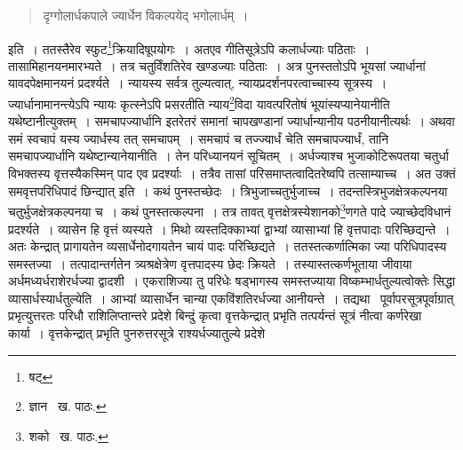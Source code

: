\documentclass[11pt, openany]{book}
\begin{document}
\begin{quote}
{\qt दृग्गोलार्धकपाले ज्यार्धेन विकल्पयेद् भगोलार्धम्~।}
\end{quote}

\noindent इति~। ततस्तैरेव स्फुट\renewcommand{\thefootnote}{१}\footnote{षट्}क्रियादिषूपयोगः~। अतएव गीतिसूत्रेऽपि कलार्धज्याः पठिताः~। तासामिहानयनमारभ्यते~। तत्र चतुर्विंशतिरेव खण्डज्याः पठिताः~। अत्र पुनस्ततोऽपि भूयसां ज्यार्धानां यावदपेक्षमानयनं प्रदर्श्यते~। न्यायस्य सर्वत्र तुल्यत्वात्, न्यायप्रदर्शनपरत्वाच्चास्य सूत्रस्य~। ज्यार्धानामानन्त्येऽपि न्यायः कृत्स्नेऽपि प्रसरतीति न्याय\renewcommand{\thefootnote}{२}\footnote{ज्ञान \textendash\ ख. पाठः.}विदा यावत्परितोषं भूयांस्यप्यानेयानीति यथेष्टानीत्युक्तम्~। समचापज्यार्धानि इतरेतरं समानां चापखण्डानां ज्यार्धान्यानीय पठनीयानीत्यर्थः~। अथवा समं स्वचापं यस्य ज्यार्धस्य तत् समचापम्~। समचापं च तज्ज्यार्धं चेति समचापज्यार्धं, तानि समचापज्यार्धानि यथेष्टान्यानेयानीति~। तेन परिध्यानयनं सूचितम्~। अर्धज्याश्च भुजाकोटिरूपतया चतुर्धा विभक्तस्य वृत्तस्यैकस्मिन् पाद एव प्रदर्श्याः~। तत्रैव तासां परिसमाप्तत्वादितरेष्वपि तत्साम्याच्च~। अत उक्तं {\qt समवृत्तपरिधिपादं छिन्द्यात्} इति~। कथं पुनस्तच्छेदः~। त्रिभुजाच्चतुर्भुजाच्च~। तदन्तस्त्रिभुजक्षेत्रकल्पनया चतुर्भुजक्षेत्रकल्पनया च~।
कथं पुनस्तत्कल्पना~। तत्र तावत् वृत्तक्षेत्रस्येशानको\renewcommand{\thefootnote}{३}\footnote{शको \textendash\ ख. पाठः.}णगते पादे ज्याच्छेदविधानं प्रदर्श्यते~। व्यासेन हि वृत्तं व्यस्यते~। मिथो व्यस्तदिक्काभ्यां द्वाभ्यां व्यासाभ्यां हि वृत्तपादाः परिच्छिद्यन्ते~। अतः केन्द्रात् प्रागायतेन व्यसार्धेनोदगायतेन चायं पादः परिच्छिद्यते~। ततस्तत्कर्णात्मिका ज्या परिधिपादस्य समस्तज्या~। तत्पादान्तर्गतेन त्र्यश्रक्षेत्रेण वृत्तपादस्य छेदः क्रियते~। तस्यास्तत्कर्णभूताया जीवाया अर्धमध्यर्धराशेरर्धज्या द्वादशी~। एकराशिज्या तु परिधेः षड्भागस्य समस्तज्याया विष्कम्भार्धतुल्यत्वोक्तेः सिद्धा व्यासार्धस्यार्धतुल्येति~। आभ्यां व्यासार्धेन चान्या एकविंशतिरर्धज्या आनीयन्ते~। तद्यथा \textendash\ पूर्वापरसूत्रपूर्वाग्रात् प्रभृत्युत्तरतः परिधौ राशिलिप्तान्तरे प्रदेशे बिन्दुं कृत्वा वृत्तकेन्द्रात् प्रभृति तत्पर्यन्तं सूत्रं नीत्वा कर्णरेखा कार्या~। वृत्तकेन्द्रात् प्रभृति पुनरुत्तरसूत्रे राश्यर्धज्यातुल्ये प्रदेशे 

\newpage
\end{document}
